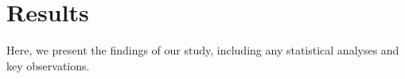 \section{Results}
\label{sec:results}

Here, we present the findings of our study, including any statistical analyses and key observations.
